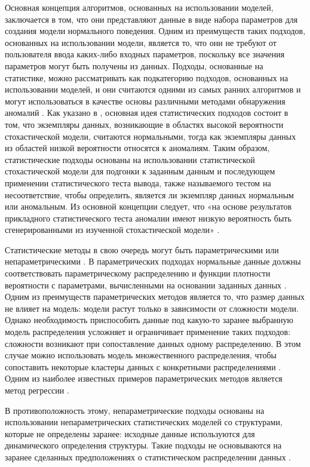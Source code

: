 Основная концепция алгоритмов, основанных на использовании моделей, заключается в том, что они представляют данные в виде набора параметров для создания модели нормального поведения. Одним из преимуществ таких подходов, основанных на использовании модели, является то, что они не требуют от пользователя ввода каких-либо входных параметров, поскольку все значения параметров могут быть получены из данных. Подходы, основанные на статистике, можно рассматривать как подкатегорию подходов, основанных на использовании моделей, и они считаются одними из самых ранних алгоритмов и могут использоваться в качестве основы различными методами обнаружения аномалий \cite{article:comp_analys_odt}. Как указано в \cite{article:15_survey_ad}, основная идея статистических подходов состоит в том, что экземпляры данных, возникающие в областях высокой вероятности стохастической модели, считаются нормальными, тогда как экземпляры данных из областей низкой вероятности относятся к аномалиям. Таким образом, статистические подходы основаны на использовании статистической стохастической модели для подгонки к заданным данным и последующем применении статистического теста вывода, также называемого тестом на несоответствие, чтобы определить, является ли экземпляр данных нормальным или аномальным. Из основной концепции следует, что «на основе результатов прикладного статистического теста аномалии имеют низкую вероятность быть сгенерированными из изученной стохастической модели» \cite{article:15_survey_ad}.

Статистические методы в свою очередь могут быть параметрическими или непараметрическими \cite{article:comp_analys_odt}. В параметрических подходах нормальные данные должны соответствовать параметрическому распределению и функции плотности вероятности с параметрами, вычисленными на основании заданных данных \cite{article:6_survey_anom_det_rtuvs}. Одним из преимуществ параметрических методов является то, что размер данных не влияет на модель: модели растут только в зависимости от сложности модели. Однако необходимость приспособить данные под какую-то заранее выбранную модель распределения усложняет и ограничивает применение таких подходов: сложности возникают при сопоставление данных одному распределению. В этом случае можно использовать модель множественного распределения, чтобы сопоставить некоторые кластеры данных с конкретными распределениями \cite{inproceedings:18_ardod_lstd}. Одним из наиболее известных примеров параметрических методов является метод регрессии \cite{article:comp_analys_odt}.

В противоположность этому, непараметрические подходы основаны на использовании непараметрических статистических моделей со структурами, которые не определены заранее: исходные данные используются для динамического определения структуры. Такие подходы не основываются на заранее сделанных предположениях о статистическом распределении данных \cite{article:comp_analys_odt}.

